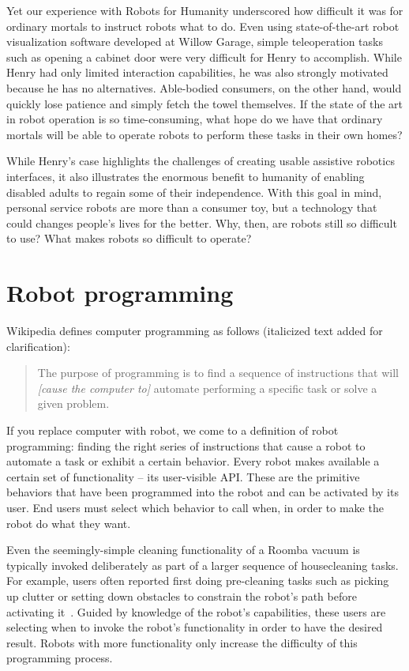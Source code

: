 \documentclass[10pt,twocolumn]{article}
\begin{document}
Yet our experience with Robots for Humanity underscored how difficult it was for ordinary mortals to instruct robots what to do. Even using state-of-the-art robot visualization software developed at Willow Garage, simple teleoperation tasks such as opening a cabinet door were very difficult for Henry to accomplish. While Henry had only limited interaction capabilities, he was also strongly motivated because he has no alternatives. Able-bodied consumers, on the other hand, would quickly lose patience and simply fetch the towel themselves. If the state of the art in robot operation is so time-consuming, what hope do we have that ordinary mortals will be able to operate robots to perform these tasks in their own homes?

While Henry's case highlights the challenges of creating usable assistive robotics interfaces, it also illustrates the enormous benefit to humanity of enabling disabled adults to regain some of their independence. With this goal in mind, personal service robots are more than a consumer toy, but a technology that could changes people's lives for the better.  Why, then, are robots still so difficult to use? What makes robots so difficult to operate?

\section{Robot programming}

Wikipedia defines computer programming as follows (italicized text added for clarification):

\begin{quote}
The purpose of programming is to find a sequence of instructions that will {\it [cause the computer to]} automate performing a specific task or solve a given problem.
\end{quote}

If you replace computer with robot, we come to a definition of robot programming: finding the right series of instructions that cause a robot to automate a task or exhibit a certain behavior. Every robot makes available a certain set of functionality -- its user-visible API. These are the primitive behaviors that have been programmed into the robot and can be activated by its user. End users must select which behavior to call when, in order to make the robot do what they want.

Even the seemingly-simple cleaning functionality of a Roomba vacuum is typically invoked deliberately as part of a larger sequence of housecleaning tasks.  For example, users often reported first doing pre-cleaning tasks such as picking up clutter or setting down obstacles to constrain the robot's path before activating it~\cite{forlizzi-hri06}. Guided by knowledge of the robot's capabilities, these users are selecting when to invoke the robot's functionality in order to have the desired result.  Robots with more functionality only increase the difficulty of this programming process.
\end{document}
